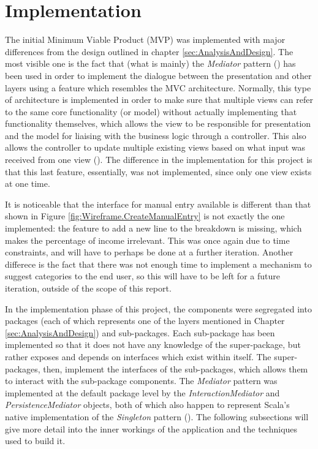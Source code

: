 \section{Implementation} \label{sec:Implementation}

The initial Minimum Viable Product (MVP) was implemented with major
differences from the design outlined in chapter \ref{sec:AnalysisAndDesign}.
The most visible one is the fact that (what is mainly) the \emph{Mediator}
pattern (\cite[][Ch.~9,~Location~3594]{nikolov2016scala}) has been used in
order to implement the dialogue between the presentation and other layers using
a feature which resembles the MVC architecture. Normally, this type of
architecture is implemented in order to make sure that multiple views can refer
to the same core functionality (or model) without actually implementing that
functionality themselves, which allows the view to be responsible for
presentation and the model for liaising with the business logic through a
controller. This also allows the controller to update multiple existing views
based on what input was received from one view
(\cite[][p.~381]{bennett2010object}). The difference in the implementation for
this project is that this last feature, essentially, was not implemented, since
only one view exists at one time.

It is noticeable that the interface for manual entry available is different
than that shown in Figure \ref{fig:Wireframe.CreateManualEntry} is not exactly
the one implemented: the feature to add a new line to the breakdown is missing,
which makes the percentage of income irrelevant. This was once again due to
time constraints, and will have to perhaps be done at a further iteration.
Another differece is the fact that there was not enough time to implement a
mechanism to suggest categories to the end user, so this will have to be left
for a future iteration, outside of the scope of this report.

In the implementation phase of this project, the components were segregated
into packages (each of which represents one of the layers mentioned in Chapter
\ref{sec:AnalysisAndDesign}) and sub-packages. Each sub-package has been
implemented so that it does not have any knowledge of the super-package, but
rather exposes and depends on interfaces which exist within itself. The
super-packages, then, implement the interfaces of the sub-packages, which
allows them to interact with the sub-package components. The \emph{Mediator}
pattern was implemented at the default package level by the
\emph{InteractionMediator} and \emph{PersistenceMediator} objects, both of
which also happen to represent Scala's native implementation of the
\emph{Singleton} pattern (\cite[][Ch.~6,~Location.~2242]{nikolov2016scala}).
The following subsections will give more detail into the inner workings of the
application and the techniques used to build it.

